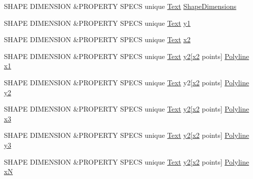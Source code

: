 \begin{DoxyCompactItemize}
\item 
S\+H\+A\+PE D\+I\+M\+E\+N\+S\+I\+ON \&P\+R\+O\+P\+E\+R\+TY S\+P\+E\+CS unique \hyperlink{classText}{Text} \hyperlink{shape__input__file__specs_8txt_a1bf25e58b08ba78abc93f104f4bc2914}{Shape\+Dimensions}
\item 
S\+H\+A\+PE D\+I\+M\+E\+N\+S\+I\+ON \&P\+R\+O\+P\+E\+R\+TY S\+P\+E\+CS unique \hyperlink{classText}{Text} \hyperlink{shape__input__file__specs_8txt_ae6da77b2f90c75c4b96658c20d0f9938}{y1}
\item 
S\+H\+A\+PE D\+I\+M\+E\+N\+S\+I\+ON \&P\+R\+O\+P\+E\+R\+TY S\+P\+E\+CS unique \hyperlink{classText}{Text} \hyperlink{shape__input__file__specs_8txt_a9f1fa2fb07ac3e1d8394274cb160df5c}{x2}
\item 
S\+H\+A\+PE D\+I\+M\+E\+N\+S\+I\+ON \&P\+R\+O\+P\+E\+R\+TY S\+P\+E\+CS unique \hyperlink{classText}{Text} \hyperlink{shape__input__file__specs_8txt_a87b0346d2b040fbc73601f3fd8171852}{y2}\mbox{[}\hyperlink{shape__input__file__specs_8txt_a9f1fa2fb07ac3e1d8394274cb160df5c}{x2} points\mbox{]} \hyperlink{classPolyline}{Polyline} \hyperlink{shape__input__file__specs_8txt_a2c75107475dd4c72dd2083af2e04d090}{x1}
\item 
S\+H\+A\+PE D\+I\+M\+E\+N\+S\+I\+ON \&P\+R\+O\+P\+E\+R\+TY S\+P\+E\+CS unique \hyperlink{classText}{Text} y2\mbox{[}\hyperlink{shape__input__file__specs_8txt_a9f1fa2fb07ac3e1d8394274cb160df5c}{x2} points\mbox{]} \hyperlink{classPolyline}{Polyline} \hyperlink{shape__input__file__specs_8txt_a87b0346d2b040fbc73601f3fd8171852}{y2}
\item 
S\+H\+A\+PE D\+I\+M\+E\+N\+S\+I\+ON \&P\+R\+O\+P\+E\+R\+TY S\+P\+E\+CS unique \hyperlink{classText}{Text} \hyperlink{shape__input__file__specs_8txt_a87b0346d2b040fbc73601f3fd8171852}{y2}\mbox{[}\hyperlink{shape__input__file__specs_8txt_a9f1fa2fb07ac3e1d8394274cb160df5c}{x2} points\mbox{]} \hyperlink{classPolyline}{Polyline} \hyperlink{shape__input__file__specs_8txt_a5d57507e254e2593e5a0a6a08c551eed}{x3}
\item 
S\+H\+A\+PE D\+I\+M\+E\+N\+S\+I\+ON \&P\+R\+O\+P\+E\+R\+TY S\+P\+E\+CS unique \hyperlink{classText}{Text} \hyperlink{shape__input__file__specs_8txt_a87b0346d2b040fbc73601f3fd8171852}{y2}\mbox{[}\hyperlink{shape__input__file__specs_8txt_a9f1fa2fb07ac3e1d8394274cb160df5c}{x2} points\mbox{]} \hyperlink{classPolyline}{Polyline} \hyperlink{shape__input__file__specs_8txt_a0f1cc68600a86252d2497b6b561b3c25}{y3}
\item 
S\+H\+A\+PE D\+I\+M\+E\+N\+S\+I\+ON \&P\+R\+O\+P\+E\+R\+TY S\+P\+E\+CS unique \hyperlink{classText}{Text} \hyperlink{shape__input__file__specs_8txt_a87b0346d2b040fbc73601f3fd8171852}{y2}\mbox{[}\hyperlink{shape__input__file__specs_8txt_a9f1fa2fb07ac3e1d8394274cb160df5c}{x2} points\mbox{]} \hyperlink{classPolyline}{Polyline} \hyperlink{shape__input__file__specs_8txt_a7c48dc90493b459f75b4b7583faca250}{xN}

\end{DoxyCompactItemize}
